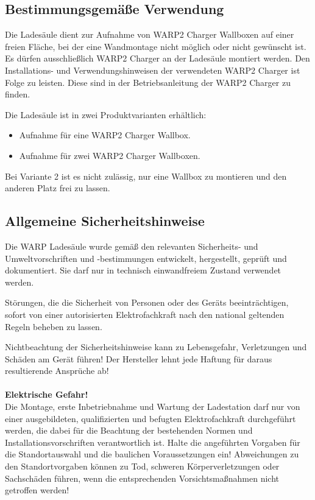 \documentclass[a4paper,10pt]{article}
\newcommand{\warn}[1]{\begin{tcolorbox}[colback=boxred,colframe=red,coltext=
white,title=Warnung]#1\end{tcolorbox}}
\begin{document}
\begin{multicols*}{2}
	\subsection{Bestimmungsgemäße Verwendung}
	Die Ladesäule dient zur Aufnahme von WARP2 Charger Wallboxen auf einer freien
	Fläche, bei der eine Wandmontage nicht möglich oder nicht gewünscht ist. 
	Es dürfen ausschließlich WARP2 Charger
	an der Ladesäule montiert werden. Den Installations- und
	Verwendungshinweisen der verwendeten WARP2 Charger ist Folge zu leisten.
	Diese sind in der Betriebsanleitung der WARP2 Charger zu finden.

	Die Ladesäule ist in zwei Produktvarianten erhältlich:
	\begin{itemize}
		\item Aufnahme für eine WARP2 Charger Wallbox.
		\item Aufnahme für zwei WARP2 Charger Wallboxen.
	\end{itemize}

	Bei Variante 2 ist es nicht zulässig, nur eine Wallbox zu montieren und den anderen Platz frei zu lassen.

	\subsection{Allgemeine Sicherheitshinweise}

	Die WARP Ladesäule wurde gemäß den relevanten Sicherheits- und Umweltvorschriften und -bestimmungen
	entwickelt, hergestellt, geprüft und dokumentiert. Sie darf nur in technisch einwandfreiem Zustand verwendet werden.

	Störungen, die die Sicherheit von Personen oder des Geräts beeinträchtigen,
	sofort von einer autorisierten Elektrofachkraft nach den national geltenden Regeln beheben zu lassen.

	\warn{Nichtbeachtung der Sicherheitshinweise kann zu Lebensgefahr,
	Verletzungen und Schäden am Gerät führen! Der Hersteller lehnt jede Haftung
	für daraus resultierende Ansprüche ab!
	\\
	\\
	\textbf{Elektrische Gefahr!}\\
	Die Montage, erste Inbetriebnahme und Wartung der Ladestation darf nur von
	einer ausgebildeten, qualifizierten und befugten Elektrofachkraft
	durchgeführt werden, die dabei für die Beachtung der bestehenden Normen und
	Installationsvorschriften verantwortlich ist. Halte die angeführten Vorgaben 
	für die Standortauswahl und die baulichen Voraussetzungen ein! Abweichungen 
	zu den Standortvorgaben können zu Tod, schweren Körperverletzungen oder 
	Sachschäden führen, wenn die entsprechenden Vorsichtsmaßnahmen nicht 
	getroffen werden!
	}


\end{multicols*}
\end{document}

